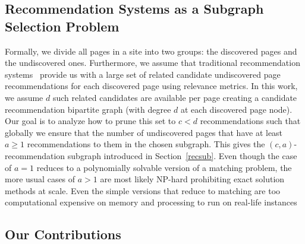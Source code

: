 \subsection{Recommendation Systems as a Subgraph Selection Problem}

Formally, we divide all pages in a site into two groups: the discovered pages and the undiscovered ones.
Furthermore, we assume that traditional recommendation systems~\cite{Schafer1999, Adomavicius2005,
  Resnick1997} provide us with a large set of related candidate undiscovered page recommendations
for each discovered page using relevance metrics. In this work, we assume $d$
such related candidates are available per page creating a candidate recommendation bipartite graph
(with degree $d$ at each discovered page node).
Our goal is to analyze how to prune this set to $c < d$ recommendations such that
globally we ensure that the number of undiscovered pages that have at least $a \geq 1$ recommendations to them in the chosen subgraph. This gives the $(c,a)$-recommendation subgraph introduced in Section~\ref{recsub}. Even though the case of $a=1$ reduces to a polynomially solvable version of a matching problem, the more usual cases of $a > 1$ are most likely NP-hard prohibiting exact solution methods at scale. Even the simple versions that reduce to matching are too computational expensive on memory and processing to run on real-life instances  

\subsection{Our Contributions}

